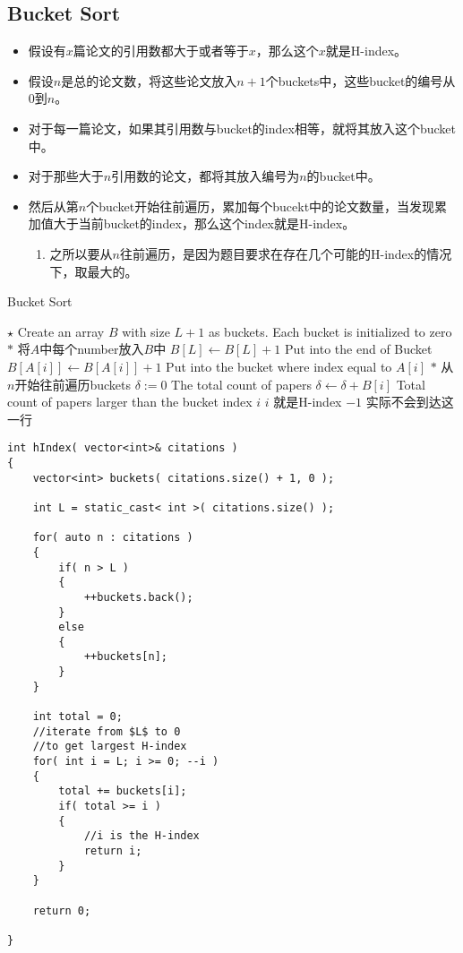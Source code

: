 \subsection{Bucket Sort}
\begin{itemize}
\item 假设有$x$篇论文的引用数都大于或者等于$x$，那么这个$x$就是H-index。
\item 假设$n$是总的论文数，将这些论文放入$n+1$个buckets中，这些bucket的编号从0到$n$。
\item 对于每一篇论文，如果其引用数与bucket的index相等，就将其放入这个bucket中。
\item 对于那些大于$n$引用数的论文，都将其放入编号为$n$的bucket中。
\item 然后从第$n$个bucket开始往前遍历，累加每个bucekt中的论文数量，当发现累加值大于当前bucket的index，那么这个index就是H-index。
\begin{enumerate}
\item 之所以要从$n$往前遍历，是因为题目要求在存在几个可能的H-index的情况下，取最大的。
\end{enumerate}
\end{itemize}
\setcounter{algorithm}{0}
\begin{algorithm}[H]
\caption{Bucket Sort}
\begin{algorithmic}[1]
\State $\star$ Create an array $B$ with size $L+1$ as buckets. Each bucket is initialized to zero
\State $\ast$ 将$A$中每个number放入$B$中
\State $B[L]\gets B[L]+1$ \Comment Put into the end of Bucket
\Else
\State $B[A[i]]\gets B[A[i]] + 1$ \Comment Put into the bucket where index equal to $A[i]$
\EndIf
\State $\ast$ 从$n$开始往前遍历buckets
\State $\delta:=0$ \Comment The total count of papers
\State $\delta\gets\delta+B[i]$
 \Comment Total count of papers larger than the bucket index
\State \Return $i$ \Comment $i$ 就是H-index
\EndIf
\EndFor
\EndFor
\State \Return $-1$ \Comment 实际不会到达这一行
\EndProcedure
\end{algorithmic}
\end{algorithm}
\setcounter{lstlisting}{0}
\begin{lstlisting}[style=customc, caption={Bucket Sort}]
int hIndex( vector<int>& citations )
{
    vector<int> buckets( citations.size() + 1, 0 );

    int L = static_cast< int >( citations.size() );

    for( auto n : citations )
    {
        if( n > L )
        {
            ++buckets.back();
        }
        else
        {
            ++buckets[n];
        }
    }

    int total = 0;
    //iterate from $L$ to 0
    //to get largest H-index
    for( int i = L; i >= 0; --i )
    {
        total += buckets[i];
        if( total >= i )
        {
            //i is the H-index
            return i;
        }
    }

    return 0;

}
\end{lstlisting}